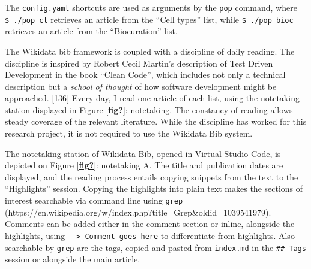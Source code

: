 The \texttt{config.yaml} shortcuts are used as arguments by the \texttt{pop} command, where \texttt{\$\ ./pop\ ct} retrieves an article from the ``Cell types'' list, while \texttt{\$\ ./pop\ bioc} retrieves an article from the ``Biocuration'' list.

The Wikidata bib framework is coupled with a discipline of daily reading.
The discipline is inspired by Robert Cecil Martin's description of Test Driven Development in the book ``Clean Code'', which includes not only a technical description but a \emph{school of thought} of how software development might be approached. {[}\protect\hyperlink{ref-13HqB23xH}{136}{]}
Every day, I read one article of each list, using the notetaking station displayed in Figure {[}\protect\hyperlink{ref-fig}{\textbf{fig?}}{]}: notetaking.
The constancy of reading allows steady coverage of the relevant literature.
While the discipline has worked for this research project, it is not required to use the Wikidata Bib system.

The notetaking station of Wikidata Bib, opened in Virtual Studio Code, is depicted on Figure {[}\protect\hyperlink{ref-fig}{\textbf{fig?}}{]}: notetaking A.
The title and publication dates are displayed, and the reading process entails copying snippets from the text to the ``Highlights'' session.
Copying the highlights into plain text makes the sections of interest searchable via command line using \texttt{grep} (https://en.wikipedia.org/w/index.php?title=Grep\&oldid=1039541979).
Comments can be added either in the comment section or inline, alongside the highlights, using \texttt{-\/-\textgreater{}\ Comment\ goes\ here} to differentiate from highlights.
Also searchable by \texttt{grep} are the tags, copied and pasted from \texttt{index.md} in the \texttt{\#\#\ Tags} session or alongside the main article.


